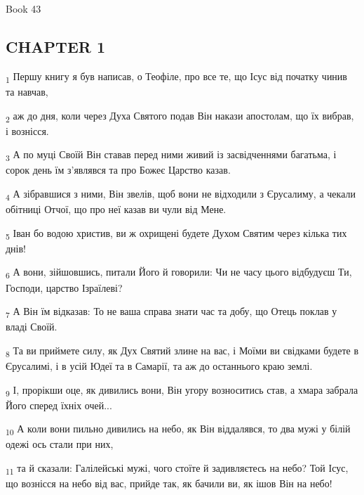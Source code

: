 Book 43
\subsection{CHAPTER 1}
\begin{tcolorbox}
\textsubscript{1} Першу книгу я був написав, о Теофіле, про все те, що Ісус від початку чинив та навчав,
\end{tcolorbox}
\begin{tcolorbox}
\textsubscript{2} аж до дня, коли через Духа Святого подав Він накази апостолам, що їх вибрав, і вознісся.
\end{tcolorbox}
\begin{tcolorbox}
\textsubscript{3} А по муці Своїй Він ставав перед ними живий із засвідченнями багатьма, і сорок день їм з'являвся та про Божеє Царство казав.
\end{tcolorbox}
\begin{tcolorbox}
\textsubscript{4} А зібравшися з ними, Він звелів, щоб вони не відходили з Єрусалиму, а чекали обітниці Отчої, що про неї казав ви чули від Мене.
\end{tcolorbox}
\begin{tcolorbox}
\textsubscript{5} Іван бо водою христив, ви ж охрищені будете Духом Святим через кілька тих днів!
\end{tcolorbox}
\begin{tcolorbox}
\textsubscript{6} А вони, зійшовшись, питали Його й говорили: Чи не часу цього відбудуєш Ти, Господи, царство Ізраїлеві?
\end{tcolorbox}
\begin{tcolorbox}
\textsubscript{7} А Він їм відказав: То не ваша справа знати час та добу, що Отець поклав у владі Своїй.
\end{tcolorbox}
\begin{tcolorbox}
\textsubscript{8} Та ви приймете силу, як Дух Святий злине на вас, і Моїми ви свідками будете в Єрусалимі, і в усій Юдеї та в Самарії, та аж до останнього краю землі.
\end{tcolorbox}
\begin{tcolorbox}
\textsubscript{9} І, прорікши оце, як дивились вони, Він угору возноситись став, а хмара забрала Його сперед їхніх очей...
\end{tcolorbox}
\begin{tcolorbox}
\textsubscript{10} А коли вони пильно дивились на небо, як Він віддалявся, то два мужі у білій одежі ось стали при них,
\end{tcolorbox}
\begin{tcolorbox}
\textsubscript{11} та й сказали: Галілейські мужі, чого стоїте й задивляєтесь на небо? Той Ісус, що вознісся на небо від вас, прийде так, як бачили ви, як ішов Він на небо!
\end{tcolorbox}
